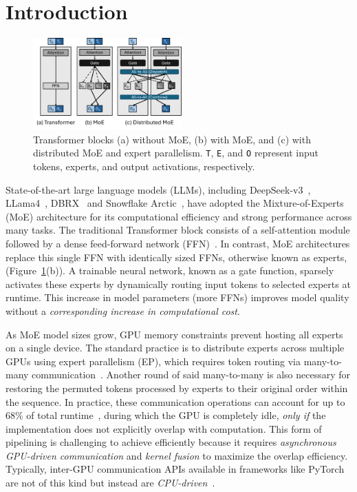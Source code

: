 \section{Introduction}\label{sec:introduction}

\begin{figure}
    \centering
    \includegraphics[width=0.51\textwidth, keepaspectratio]{figures/fig-bg-moe}
    \caption{Transformer blocks (a) without MoE, (b) with MoE, and (c) with distributed MoE and expert parallelism.
    \texttt{T}, \texttt{E}, and \texttt{O} represent input tokens, experts, and output activations, respectively.}
    \label{fig:bg:moe}
    \vspace{-10pt}
\end{figure}
State-of-the-art large language models (LLMs), including DeepSeek-v3~\cite{deepep}, LLama4~\cite{llama4},
DBRX~\cite{dbrx} and Snowflake Arctic~\cite{arctic},
have adopted the Mixture-of-Experts (MoE) architecture for its
computational efficiency and strong performance across many tasks.
The traditional Transformer block consists of a self-attention module followed by a
dense feed-forward network (FFN)~\cite{NIPS2017_3f5ee243}.
In contrast, MoE architectures replace this single FFN with identically sized FFNs,
otherwise known as experts, (Figure~\ref{fig:bg:moe}(b)).
A trainable neural network, known as a gate function, sparsely activates these experts by
dynamically routing input tokens to selected experts at runtime.
This increase in model parameters (more FFNs) improves model quality without a
\textit{corresponding increase in computational cost}.

As MoE model sizes grow, GPU memory constraints prevent hosting all experts on a single device.
The standard practice is to distribute experts across multiple GPUs using expert parallelism (EP),
which requires token routing via many-to-many communication~\cite{deepep, arctic, dbrx, 10.1145/3577193.3593704}.
Another round of said many-to-many is also necessary for restoring the permuted tokens processed by experts
to their original order within the sequence.
In practice, these communication operations
can account for up to 68\% of total runtime~\cite{10.1145/3603269.3604869, MLSYS2024_339caf45},
during which the GPU is completely idle, \emph{only if} the implementation does not explicitly overlap with computation.
This form of pipelining is challenging to achieve efficiently because it requires
\emph{asynchronous GPU-driven communication} and \emph{kernel fusion} to maximize the overlap efficiency.
Typically, inter-GPU communication APIs available in frameworks like PyTorch are not of this kind but instead are
\emph{CPU-driven}~\cite{nccl}.

